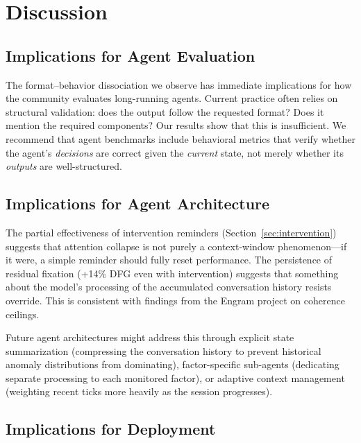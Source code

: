 \documentclass{article}
\begin{document}
\section{Discussion}
\label{sec:discussion}

\subsection{Implications for Agent Evaluation}

The format--behavior dissociation we observe has immediate implications
for how the community evaluates long-running agents. Current practice
often relies on structural validation: does the output follow the
requested format? Does it mention the required components? Our results
show that this is insufficient. We recommend that agent benchmarks
include behavioral metrics that verify whether the agent's
\emph{decisions} are correct given the \emph{current} state, not
merely whether its \emph{outputs} are well-structured.

\subsection{Implications for Agent Architecture}

The partial effectiveness of intervention reminders (Section~\ref{sec:intervention})
suggests that attention collapse is not purely a context-window
phenomenon---if it were, a simple reminder should fully reset
performance. The persistence of residual fixation (+14\% DFG even with
intervention) suggests that something about the model's processing of
the accumulated conversation history resists override. This is
consistent with findings from the Engram project \cite{engram2026} on
coherence ceilings.

Future agent architectures might address this through explicit state
summarization (compressing the conversation history to prevent
historical anomaly distributions from dominating), factor-specific
sub-agents (dedicating separate processing to each monitored factor), or
adaptive context management (weighting recent ticks more heavily as the
session progresses).

\subsection{Implications for Deployment}
\end{document}
